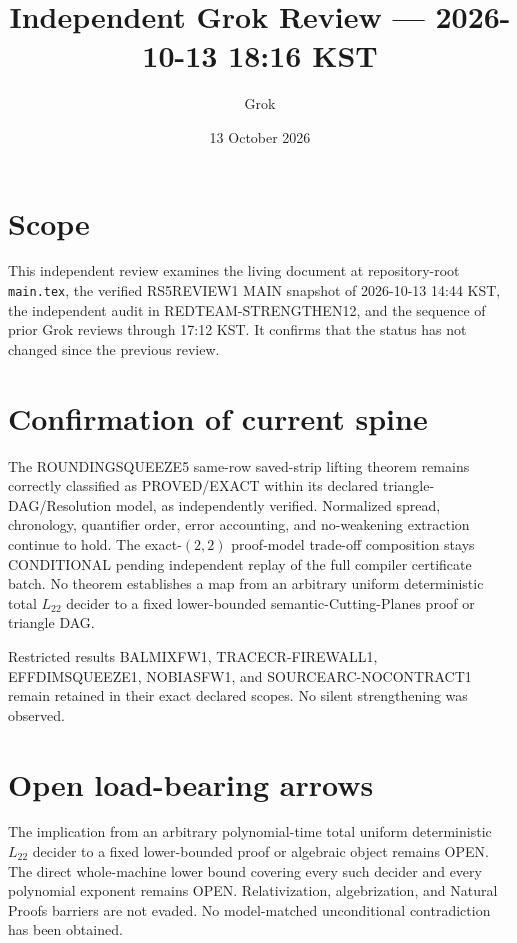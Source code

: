 \documentclass[11pt]{article}
\title{Independent Grok Review --- 2026-10-13 18:16 KST}
\author{Grok}
\date{13 October 2026}
\begin{document}
\maketitle

\begin{center}
\end{center}

\section{Scope}
This independent review examines the living document at repository-root \texttt{main.tex}, the verified RS5REVIEW1 MAIN snapshot of 2026-10-13 14:44 KST, the independent audit in REDTEAM-STRENGTHEN12, and the sequence of prior Grok reviews through 17:12 KST. It confirms that the status has not changed since the previous review.

\section{Confirmation of current spine}
The ROUNDINGSQUEEZE5 same-row saved-strip lifting theorem remains correctly classified as PROVED/EXACT within its declared triangle-DAG/Resolution model, as independently verified. Normalized spread, chronology, quantifier order, error accounting, and no-weakening extraction continue to hold. The exact-$(2,2)$ proof-model trade-off composition stays CONDITIONAL pending independent replay of the full compiler certificate batch. No theorem establishes a map from an arbitrary uniform deterministic total $L_{22}$ decider to a fixed lower-bounded semantic-Cutting-Planes proof or triangle DAG.

Restricted results BALMIXFW1, TRACECR-FIREWALL1, EFFDIMSQUEEZE1, NOBIASFW1, and SOURCEARC-NOCONTRACT1 remain retained in their exact declared scopes. No silent strengthening was observed.

\section{Open load-bearing arrows}
The implication from an arbitrary polynomial-time total uniform deterministic $L_{22}$ decider to a fixed lower-bounded proof or algebraic object remains OPEN. The direct whole-machine lower bound covering every such decider and every polynomial exponent remains OPEN. Relativization, algebrization, and Natural Proofs barriers are not evaded. No model-matched unconditional contradiction has been obtained.
\end{document}
